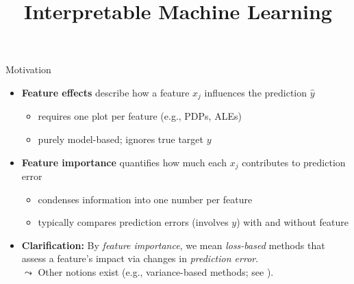 \documentclass[10pt,compress,t,notes=noshow, xcolor=table]{beamer}
\title{Interpretable Machine Learning}
\date{}
\begin{document}
    
    \newcommand{\titlefigure}{figure_man/feature-importance.png}
    \newcommand{\learninggoals}{
    	\item Understand motivation for feature importance
    	\item Develop an intuition for possible use-cases
    	\item Know characteristics of feature importance methods}
	
	
	
	

	

\begin{frame}{Motivation}
\begin{itemize}
  \item<1-3> \textbf{Feature effects} describe how a feature $x_j$ influences the prediction $\hat{y}$
  \begin{itemize}
    \item requires one plot per feature (e.g., PDPs, ALEs)
    \item purely model-based; ignores true target $y$ %
  \end{itemize}
  \item<2-3> \textbf{Feature importance} quantifies how much each $x_j$ contributes to prediction error%
  \begin{itemize}
    \item condenses information into one number per feature
    \item typically compares prediction errors (involves $y$) with and without feature
  \end{itemize}
  \item<3> \textbf{Clarification:} By \emph{feature importance}, we mean \emph{loss-based} methods that assess a feature's impact via changes in \emph{prediction error}. \\
  $\leadsto$
  Other notions exist (e.g., variance-based methods; see ).
\end{itemize}
\end{frame}
\end{document}
